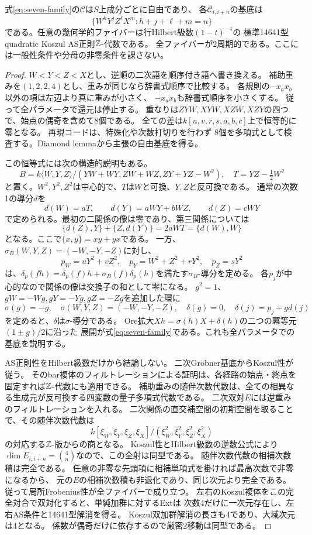 \begin{theorem}[全ファイバーで正則な代数的族]\label{thm:algebraic-seven}
式\eqref{eq:seven-family}の$\mathcal C$は$S$上成分ごとに自由であり、
各$\mathcal C_{i,i+n}$の基底は
\[
 \{W^{h}Y^{j}Z^{\ell}X^{m}:h+j+\ell+m=n\}
\]
である。任意の幾何学的ファイバーは行Hilbert級数$(1-t)^{-4}$の
標準14641型quadratic Koszul AS正則$\mathbb Z$-代数である。
全ファイバーが2周期的である。ここには一般性条件や分母の非零条件を課さない。
\end{theorem}
\begin{proof}
$W<Y<Z<X$とし、逆順の二次語を順序付き語へ書き換える。
補助重みを$(1,2,2,4)$とし、重みが同じなら辞書式順序で比較する。
各規則の$-x_ax_b$以外の項は左辺より真に重みが小さく、
$-x_ax_b$も辞書式順序を小さくする。
従って全パラメータで還元は停止する。
重なりは$ZYW,XYW,XZW,XZY$の四つで、始点の偶奇を含めて8個である。
全ての差は$k[u,v,r,s,a,b,c]$上で恒等的に零となる。
再現コードは、特殊化や次数打切りを行わず
8個を多項式として検査する。Diamond lemma\cite[Theorem 1.2]{Bergman}から主張の自由基底を得る。

この恒等式には次の構造的説明もある。
\[
 B=k\langle W,Y,Z\rangle/(YW+WY,ZW+WZ,ZY+YZ-W^2),\quad T=YZ-\tfrac12W^2
\]
と置く。$W^2,Y^2,Z^2$は中心的で、$T$は$W$と可換、$Y,Z$と反可換である。
通常の次数1の導分$d$を
\[
 d(W)=aT,\qquad d(Y)=aWY+bWZ,\qquad d(Z)=cWY
\]
で定められる。最初の二関係の像は零であり、第三関係については
\[
 \{d(Z),Y\}+\{Z,d(Y)\}=2aWT=\{d(W),W\}
\]
となる。ここで$\{x,y\}=xy+yx$である。
一方、$\sigma_B(W,Y,Z)=(-W,-Y,-Z)$に対し、
\[
 p_W=uY^2+vZ^2,\quad p_Y=W^2+Z^2+rY^2,\quad p_Z=sY^2
\]
は、$\delta_p(fh)=\delta_p(f)h+\sigma_B(f)\delta_p(h)$を満たす$\sigma_B$-導分を定める。
各$p_j$が中心的なので関係の像は交換子の和として零になる。
$g^2=1$、$gW=-Wg,gY=-Yg,gZ=-Zg$を追加した環に
\[
 \sigma(g)=-g,\quad\sigma(W,Y,Z)=(-W,-Y,-Z),\quad
 \delta(g)=0,\quad\delta(j)=p_j+g d(j)
\]
を定めると、$\delta$は$\sigma$-導分である。
Ore拡大$Xh=\sigma(h)X+\delta(h)$の二つの冪等元$(1\pm g)/2$に沿った
展開が式\eqref{eq:seven-family}である。これも全パラメータでの基底を説明する。

AS正則性をHilbert級数だけから結論しない。
二次Gr\"obner基底からKoszul性が従う\cite[Theorem 5.3]{Priddy}。
そのbar複体のフィルトレーションによる証明は、各経路の始点・終点を固定すれば$\mathbb Z$-代数にも適用できる。
補助重みの随伴次数代数は、全ての相異なる生成元が反可換する四変数の量子多項式代数である。
二次双対$E$には逆重みのフィルトレーションを入れる。
二次関係の直交補空間の初期空間を取ることで、その随伴次数代数は
\[
 k[\xi_W,\xi_Y,\xi_Z,\xi_X]/(\xi_W^2,\xi_Y^2,\xi_Z^2,\xi_X^2)
\]
の対応する$\mathbb Z$-版からの商となる。
Koszul性とHilbert級数の逆数公式により$\dim E_{i,i+n}=\binom4n$なので、この全射は同型である。
随伴次数代数の相補次数積は完全である。
任意の非零な先頭項に相補単項式を掛ければ最高次数で非零になるから、
元の$E$の相補次数積も非退化であり、同じ次元より完全である。
従って局所Frobenius性が全ファイバーで成り立つ。
左右のKoszul複体をこの完全対合で双対化すると、単純加群に対するExtは
次数4だけに一次元存在し、左右AS条件と14641型解消を得る。
Koszul双加群解消の長さも4であり、大域次元は4となる。
係数が偶奇だけに依存するので厳密2移動は同型である。
\end{proof}

